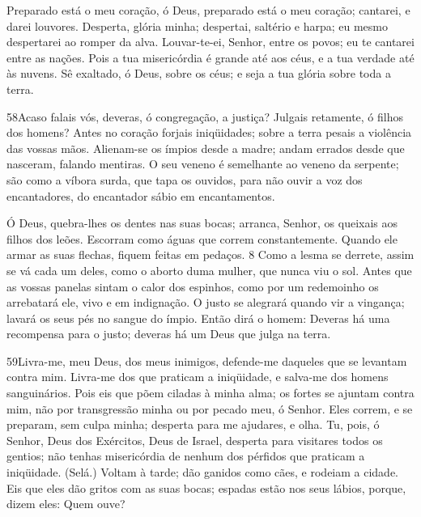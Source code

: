 Preparado está o meu coração, ó Deus, preparado está o meu
coração; cantarei, e darei louvores. Desperta, glória minha;
despertai, saltério e harpa; eu mesmo despertarei ao romper da alva.
Louvar-te-ei, Senhor, entre os povos; eu te cantarei entre as
nações. Pois a tua misericórdia é grande até aos céus, e a
tua verdade até às nuvens. Sê exaltado, ó Deus, sobre os
céus; e seja a tua glória sobre toda a terra.

\bigskip

\lettrine{58}{}Acaso falais vós, deveras, ó congregação, a
justiça? Julgais retamente, ó filhos dos homens? Antes no
coração forjais iniqüidades; sobre a terra pesais a violência das
vossas mãos. Alienam-se os ímpios desde a madre; andam errados
desde que nasceram, falando mentiras. O seu veneno é semelhante
ao veneno da serpente; são como a víbora surda, que tapa os ouvidos,
para não ouvir a voz dos encantadores, do encantador sábio em
encantamentos.

Ó Deus, quebra-lhes os dentes nas suas bocas; arranca, Senhor, os
queixais aos filhos dos leões. Escorram como águas que correm
constantemente. Quando ele armar as suas flechas, fiquem feitas em
pedaços. 8 Como a lesma se derrete, assim se vá cada um deles, como
o aborto duma mulher, que nunca viu o sol. Antes que as vossas
panelas sintam o calor dos espinhos, como por um redemoinho os
arrebatará ele, vivo e em indignação. O justo se alegrará
quando vir a vingança; lavará os seus pés no sangue do ímpio.
Então dirá o homem: Deveras há uma recompensa para o justo;
deveras há um Deus que julga na terra.

\bigskip

\lettrine{59}{}Livra-me, meu Deus, dos meus inimigos,
defende-me daqueles que se levantam contra mim. Livra-me dos que
praticam a iniqüidade, e salva-me dos homens sanguinários. Pois
eis que põem ciladas à minha alma; os fortes se ajuntam contra mim,
não por transgressão minha ou por pecado meu, ó Senhor. Eles
correm, e se preparam, sem culpa minha; desperta para me ajudares, e
olha. Tu, pois, ó Senhor, Deus dos Exércitos, Deus de Israel,
desperta para visitares todos os gentios; não tenhas misericórdia de
nenhum dos pérfidos que praticam a iniqüidade. (Selá.) Voltam à
tarde; dão ganidos como cães, e rodeiam a cidade. Eis que eles
dão gritos com as suas bocas; espadas estão nos seus lábios, porque,
dizem eles: Quem ouve?

